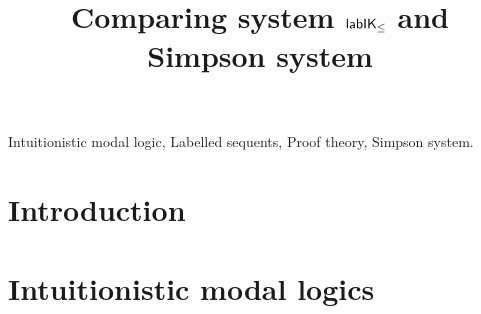 \documentclass[twoside]{aiml18}
\begin{document}
\begin{frontmatter}
  \title{Comparing system $\mathsf{lab}\mathsf{IK}_{\le}$ and Simpson system}

 \begin{abstract}


  \end{abstract}

  \begin{keyword}
  Intuitionistic modal logic, Labelled sequents, Proof theory, Simpson system.
  \end{keyword}
 \end{frontmatter}


\section{Introduction}


\section{Intuitionistic modal logics}
\end{document}
